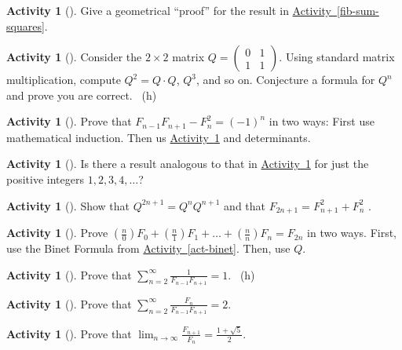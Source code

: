 \documentclass[10pt,]{book}
\theoremstyle{plain}
\theoremstyle{definition}
\theoremstyle{definition}
\theoremstyle{definition}
\newtheorem{activity}[project]{Activity}
\numberwithin{equation}{chapter}
\newcommand{\amp}{&}
\begin{document}
\begin{activity}[]\label{activity-148}
\hypertarget{p-967}{}%
Give a geometrical ``proof'' for the result in \hyperref[fib-sum-squares]{Activity~\ref{fib-sum-squares}}.%
\end{activity}
\begin{activity}[]\label{fib-matrix}
\hypertarget{p-968}{}%
Consider the \(2\times 2\) matrix \(Q = 
\begin{pmatrix}
0 \amp 1\\
1 \amp 1
\end{pmatrix}.\) Using standard matrix multiplication, compute \(Q^2 = Q\cdot Q\), \(Q^3\), and so on.  Conjecture a formula for \(Q^n\) and prove you are correct.%
~{\tiny (h)}\end{activity}
\begin{activity}[]\label{fib-neg-one}
\hypertarget{p-970}{}%
Prove that \(F_{n - 1}F_{n + 1} - F_{n}^{2} = (-1)^{n}\) in two ways:  First use mathematical induction.  Then us \hyperref[fib-matrix]{Activity~\ref{fib-matrix}} and determinants.%
\end{activity}
\begin{activity}[]\label{activity-151}
\hypertarget{p-971}{}%
Is there a result analogous to that in \hyperref[fib-neg-one]{Activity~\ref{fib-neg-one}} for just the positive integers \(1, 2, 3, 4, \ldots\)?%
\end{activity}
\begin{activity}[]\label{activity-152}
\hypertarget{p-972}{}%
Show that \(Q^{2n + 1} = Q^{n}Q^{n+1}\) and that \(F_{2n + 1} = F_{n + 1}^{2} + F_{n}^{2}\) .%
\end{activity}
\begin{activity}[]\label{activity-153}
\hypertarget{p-973}{}%
Prove \(\left( \frac{n}{0} \right)F_{0} + \left( \frac{n}{1} \right)F_{1} + \ldots + \left( \frac{n}{n} \right)F_{n} = F_{2n}\) in two ways.  First, use the Binet Formula from \hyperref[act-binet]{Activity~\ref{act-binet}}.  Then, use \(Q\).%
\end{activity}
\begin{activity}[]\label{activity-154}
\hypertarget{p-974}{}%
Prove that \(\sum_{n = 2}^{\infty}\frac{1}{F_{n - 1}F_{n + 1}} = 1\).%
~{\tiny (h)}\end{activity}
\begin{activity}[]\label{activity-155}
\hypertarget{p-976}{}%
Prove that \(\sum_{n = 2}^{\infty}\frac{F_{n}}{F_{n - 1}F_{n + 1}} = 2.\)%
\end{activity}
\begin{activity}[]\label{activity-156}
\hypertarget{p-977}{}%
Prove that \(\lim_{n\to\infty}\frac{F_{n + 1}}{F_{n}} = \frac{1 + \sqrt{5}}{2}.\)%
\end{activity}
\end{document}
